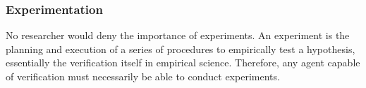 



\subsubsection{Experimentation}
\label{section-experimentation}
No researcher would deny the importance of experiments. An experiment is the planning and execution of a series of procedures to empirically test a hypothesis, essentially the verification itself in empirical science. Therefore, any agent capable of verification must necessarily be able to conduct experiments.

